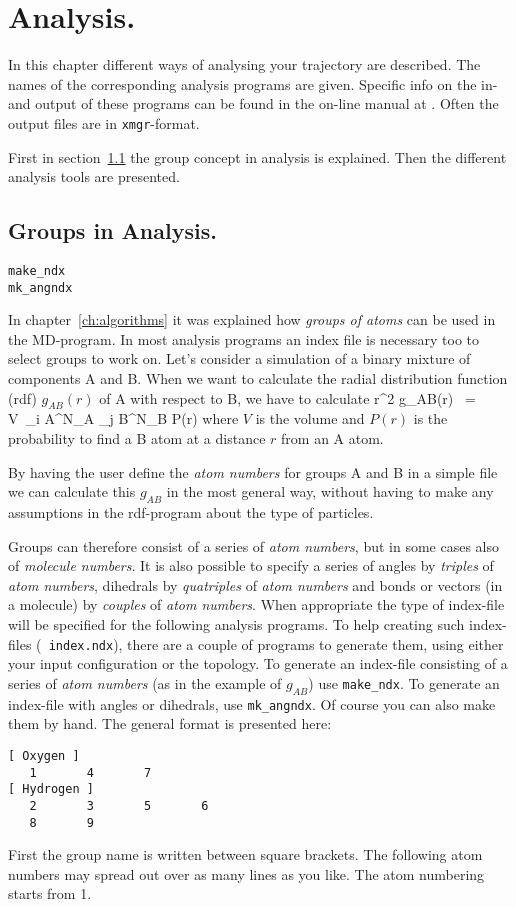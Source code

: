 \chapter{Analysis.}
\label{ch:analysis}
In this chapter different ways of analysing your trajectory are described. 
The names of the corresponding analysis programs are given. 
Specific info on the in- and output of these programs can be found 
in the on-line manual at {\wwwpage}.
Often the output files are in {\tt xmgr}-format.

First in section~\ref{sec:groups} the group concept in analysis is explained. 
Then the different analysis tools are presented.
%
%
\section{Groups in Analysis.}
\label{sec:groups}
\begin{verbatim}
make_ndx
mk_angndx
\end{verbatim}
In chapter~\ref{ch:algorithms} it was explained how {\em groups of atoms} can 
be used in the MD-program. 
In most analysis programs an index file is necessary too to select groups to
work on. Let's consider a simulation of a binary mixture of components A and
B. When we want to calculate the radial distribution function (rdf) 
$g_{AB}(r)$ of A with respect to B, we have to calculate
\pi r^2 g_{AB}(r)	~=~	V~\sum_{i \in A}^{N_A} \sum_{j \in B}^{N_B} P(r)
\eeq
where $V$ is the volume and $P(r)$ is the probability to find a B atom
at a distance $r$ from an A atom.

By having the user define the {\em atom numbers} for groups A and B in
a simple file we can calculate this $g_{AB}$ in the most general way, without
having to make any assumptions in the rdf-program about the type of 
particles. 

Groups can therefore consist of a series of {\em atom numbers}, but in
some cases also of {\em molecule numbers}.  It is also possible to
specify a series of angles by {\em triples} of {\em atom numbers},
dihedrals by {\em quatriples} of {\em atom numbers} and bonds or
vectors (in a molecule) by {\em couples} of {\em atom numbers}. When
appropriate the type of index-file will be specified for the following
analysis programs.  To help creating such index-files ({\tt
index.ndx}), there are a couple of programs to generate them, using
either your input configuration or the topology.  To generate an
index-file consisting of a series of {\em atom numbers} (as in the
example of $g_{AB}$) use {\tt make\_ndx}. To generate an index-file
with angles or dihedrals, use {\tt mk\_angndx}. Of course you can also
make them by hand. The general format is presented here:
\begin{verbatim}
[ Oxygen ]
   1       4       7 
[ Hydrogen ]
   2       3       5       6
   8       9
\end{verbatim}
First the group name is written between square brackets.
The following atom numbers may spread out over as many lines as you like.
The atom numbering starts from 1. 
%
%
